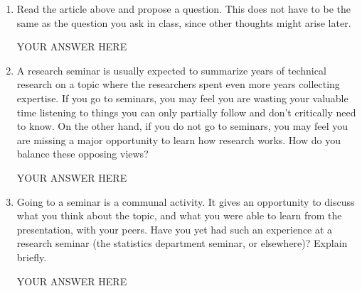 \documentclass[12pt]{article}
\begin{document}
\begin{enumerate}

\item Read the article above and propose a question. This does not have to be the same as the question you ask in class, since other thoughts might arise later.
  
YOUR ANSWER HERE

\item A research seminar is usually expected to summarize years of technical research on a topic where the researchers spent even more years collecting expertise. If you go to seminars, you may feel you are wasting your valuable time listening to things you can only partially follow and don't critically need to know. On the other hand, if you do not go to seminars, you may feel you are missing a major opportunity to learn how research works. How do you balance these opposing views?

YOUR ANSWER HERE
  
\item Going to a seminar is a communal activity. It gives an opportunity to discuss what you think about the topic, and what you were able to learn from the presentation, with your peers. Have you yet had such an experience at a research seminar (the statistics department seminar, or elsewhere)? Explain briefly.

YOUR ANSWER HERE
    
\end{enumerate}
\end{document}
